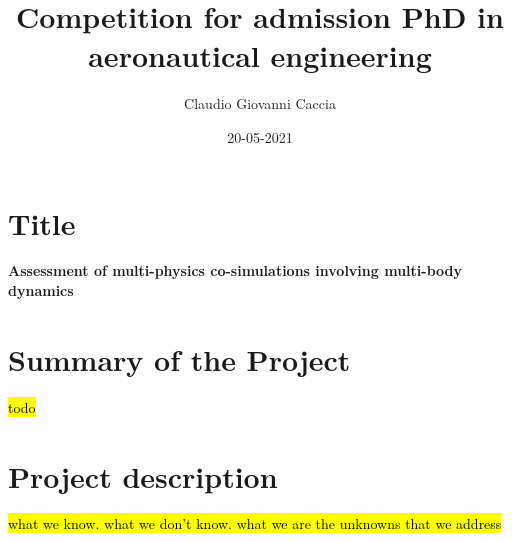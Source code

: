 \documentclass[a4paper]{article}
\title{Competition for admission PhD in \\ aeronautical engineering}
\author{Claudio Giovanni Caccia}
\date{20-05-2021}
\begin{document}
\maketitle

\section*{Title}

\textbf{Assessment of multi-physics co-simulations involving multi-body dynamics}

\section*{Summary of the Project}

\hl{todo}


\section*{Project description}





\hl{what we know. what we don't know. what we are the unknowns that we address}




\newpage








%



\printbibliography
\end{document}
